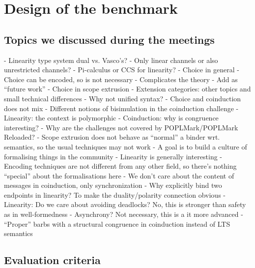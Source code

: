 \documentclass[runningheads]{llncs}
\begin{document}
\section{Design of the benchmark}
\subsection{Topics we discussed during the meetings}
- Linearity type system dual vs. Vasco's?
- Only linear channels or also unrestricted channels?
- Pi-calculus or CCS for linearity?
- Choice in general
  - Choice can be encoded, so is not necessary
  - Complicates the theory
  - Add as ``future work''
- Choice in scope extrusion
- Extension categories: other topics and small technical differences
- Why not unified syntax?
  - Choice and coinduction does not mix
- Different notions of bisimulation in the coinduction challenge
- Linearity: the context is polymorphic
- Coinduction: why is congruence interesting?
- Why are the challenges not covered by POPLMark/POPLMark Reloaded?
- Scope extrusion does not behave as ``normal'' a binder wrt. semantics, so the usual techniques may not work
- A goal is to build a culture of formalising things in the community
- Linearity is generally interesting
- Encoding techniques are not different from any other field, so there's nothing ``special'' about the formalisations here
- We don't care about the content of messages in coinduction, only synchronization
- Why explicitly bind two endpoints in linearity? To make the duality/polarity connection obvious
- Linearity: Do we care about avoiding deadlocks? No, this is stronger than safety as in well-formedness
- Asynchrony? Not necessary, this is a it more advanced
- ``Proper'' barbs with a structural congruence in coinduction instead of LTS semantics

\subsection{Evaluation criteria}
\end{document}

